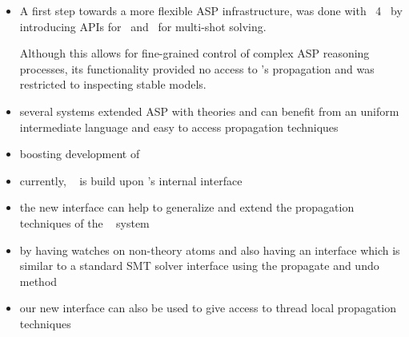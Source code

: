 \begin{itemize}
\item 
A first step towards a more flexible ASP infrastructure,
was done with \clingo~4~\cite{gekakasc14b} by introducing APIs for \lua\ and \python\ for multi-shot solving.

Although this allows for fine-grained control of complex ASP reasoning processes,
its functionality provided no access to \clasp's propagation and was restricted to inspecting stable models.
\item several systems extended ASP with theories and can benefit from an uniform intermediate language
and easy to access propagation techniques
\item boosting development of \dlvhex{}
\item currently, \dlvhex~\cite{eifikrre12a} is build upon \clasp's internal interface 
\item the new interface can help to generalize and extend the propagation techniques of the \dlvhex{}~\cite{eifikrre12a} system
\item by having watches on non-theory atoms and also having an interface which is similar to a standard SMT solver interface
using the propagate and undo method
\item our new interface can also be used to give access to thread local propagation techniques

\end{itemize}
